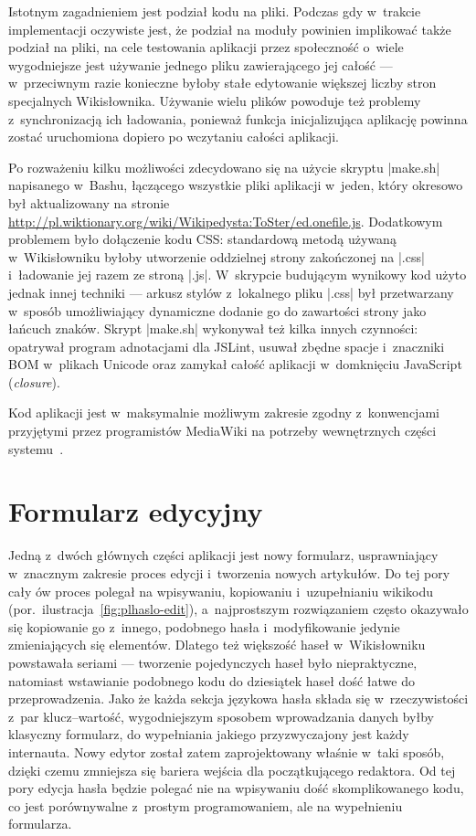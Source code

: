 Istotnym zagadnieniem jest podział kodu na pliki. Podczas gdy w~trakcie implementacji oczywiste jest, że podział na moduły powinien implikować także podział na pliki, na cele testowania aplikacji przez społeczność o~wiele wygodniejsze jest używanie jednego pliku zawierającego jej całość --- w~przeciwnym razie konieczne byłoby stałe edytowanie większej liczby stron specjalnych Wikisłownika. Używanie wielu plików powoduje też problemy z~synchronizacją ich ładowania, ponieważ funkcja inicjalizująca aplikację powinna zostać uruchomiona dopiero po wczytaniu całości aplikacji.

Po rozważeniu kilku możliwości zdecydowano się na użycie skryptu \kod|make.sh| napisanego w~Bashu, łączącego wszystkie pliki aplikacji w~jeden, który okresowo był aktualizowany na stronie \url{http://pl.wiktionary.org/wiki/Wikipedysta:ToSter/ed.onefile.js}. Dodatkowym problemem było dołączenie kodu CSS: standardową metodą używaną w~Wikisłowniku byłoby utworzenie oddzielnej strony zakończonej na \kod|.css| i~ładowanie jej razem ze stroną \kod|.js|. W~skrypcie budującym wynikowy kod użyto jednak innej techniki --- arkusz stylów z~lokalnego pliku \kod|.css| był przetwarzany w~sposób umożliwiający dynamiczne dodanie go do zawartości strony jako łańcuch znaków. Skrypt \kod|make.sh| wykonywał też kilka innych czynności: opatrywał program adnotacjami dla JSLint, usuwał zbędne spacje i~znaczniki BOM w~plikach Unicode oraz zamykał całość aplikacji w~domknięciu JavaScript (\emph{closure}).

Kod aplikacji jest w~maksymalnie możliwym zakresie zgodny z~konwencjami przyjętymi przez programistów MediaWiki na potrzeby wewnętrznych części systemu~\cite{mw:conventions}.

\section{Formularz edycyjny}
\label{sec:impl-form}

Jedną z~dwóch głównych części aplikacji jest nowy formularz, usprawniający w~znacznym zakresie proces edycji i~tworzenia nowych artykułów. Do tej pory cały ów proces polegał na wpisywaniu, kopiowaniu i~uzupełnianiu wikikodu (por.~ilustracja~\ref{fig:plhaslo-edit}), a~najprostszym rozwiązaniem często okazywało się kopiowanie go z~innego, podobnego hasła i~modyfikowanie jedynie zmieniających się elementów. Dlatego też większość haseł w~Wikisłowniku powstawała seriami --- tworzenie pojedynczych haseł było niepraktyczne, natomiast wstawianie podobnego kodu do dziesiątek haseł dość łatwe do przeprowadzenia. Jako że każda sekcja językowa hasła składa się w~rzeczywistości z~par klucz--wartość, wygodniejszym sposobem wprowadzania danych byłby klasyczny formularz, do wypełniania jakiego przyzwyczajony jest każdy internauta. Nowy edytor został zatem zaprojektowany właśnie w~taki sposób, dzięki czemu zmniejsza się bariera wejścia dla początkującego redaktora. Od tej pory edycja hasła będzie polegać nie na wpisywaniu dość skomplikowanego kodu, co jest porównywalne z~prostym programowaniem, ale na wypełnieniu formularza.

